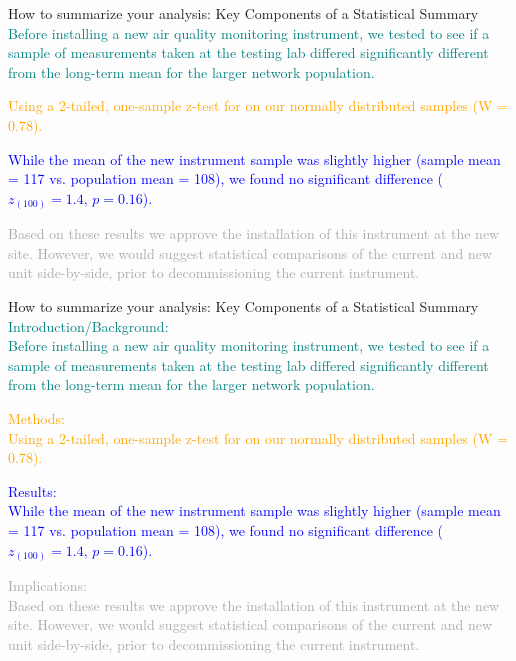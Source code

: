 \documentclass[
  ignorenonframetext,
]{beamer}
\begin{document}
\begin{frame}{How to summarize your analysis: Key Components of a
Statistical Summary}
\label{how-to-summarize-your-analysis-key-components-of-a-statistical-summary}
\textcolor{teal}{Before installing a new air quality monitoring instrument, we tested to see if a sample of measurements taken at the testing lab differed significantly different from the long-term mean for the larger network population.}

\textcolor{orange}{Using a 2-tailed, one-sample z-test for on our normally distributed samples (W = 0.78).}

\textcolor{blue}{While the mean of the new instrument sample was slightly higher (sample mean = 117 vs. population mean = 108), we found no significant difference (\( z_{(100)} = 1.4, \, p = 0.16 \)).}

\textcolor{darkgray}{Based on these results we approve the installation of this instrument at the new site. However, we would suggest statistical comparisons of the current and new unit side-by-side, prior to decommissioning the current instrument.}
\end{frame}

\begin{frame}{How to summarize your analysis: Key Components of a
Statistical Summary}
\label{how-to-summarize-your-analysis-key-components-of-a-statistical-summary-1}
\textcolor{teal}{Introduction/Background:\\
Before installing a new air quality monitoring instrument, we tested to see if a sample of measurements taken at the testing lab differed significantly different from the long-term mean for the larger network population.}

\textcolor{orange}{Methods:\\
Using a 2-tailed, one-sample z-test for on our normally distributed samples (W = 0.78).}

\textcolor{blue}{Results:\\
While the mean of the new instrument sample was slightly higher (sample mean = 117 vs. population mean = 108), we found no significant difference (\( z_{(100)} = 1.4, \, p = 0.16 \)).}

\textcolor{darkgray}{Implications:\\
Based on these results we approve the installation of this instrument at the new site. However, we would suggest statistical comparisons of the current and new unit side-by-side, prior to decommissioning the current instrument.}
\end{frame}
\end{document}
